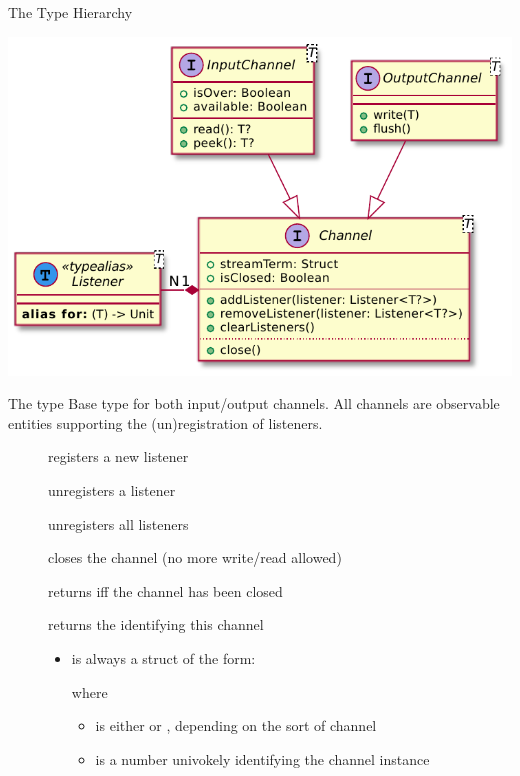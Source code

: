\documentclass[handout]{beamer}
\begin{document}
\begin{frame}[allowframebreaks]{The  Type Hierarchy}
    \begin{center}
        \includegraphics[width=.6\linewidth]{img/channels.pdf}
    \end{center}

    \begin{block}{The  type}\centering
        Base type for both input/output channels.
        All channels are \alert{observable} entities supporting the (un)registration of \alert{listeners}.
    \end{block}
    \begin{description}
        \item[] registers a new listener
        \item[] unregisters a listener
        \item[] unregisters all listeners
        \item[] closes the channel (no more write/read allowed)
        \item[] returns  iff the channel has been closed
        \item[] returns the  identifying this channel
        \begin{itemize}\small
            \item is always a struct of the form:
            \begin{center}
            \end{center}
            where
            \begin{itemize}\scriptsize
                \item {} is either  or , depending on the sort of channel
                \item {} is a number univokely identifying the channel instance
            \end{itemize}
        \end{itemize}
    \end{description}


\end{frame}
\end{document}
